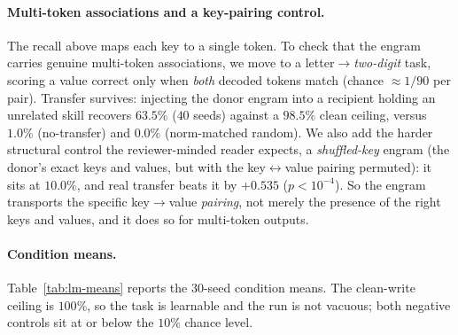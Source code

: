 \documentclass[11pt]{article}
\theoremstyle{definition}
\begin{document}
\paragraph{Multi-token associations and a key-pairing control.}
The recall above maps each key to a single token. To check that the engram carries genuine multi-token associations, we move to a letter$\to$\emph{two-digit} task, scoring a value correct only when \emph{both} decoded tokens match (chance $\approx 1/90$ per pair). Transfer survives: injecting the donor engram into a recipient holding an unrelated skill recovers $63.5\%$ ($40$ seeds) against a $98.5\%$ clean ceiling, versus $1.0\%$ (no-transfer) and $0.0\%$ (norm-matched random). We also add the harder structural control the reviewer-minded reader expects, a \emph{shuffled-key} engram (the donor's exact keys and values, but with the key$\leftrightarrow$value pairing permuted): it sits at $10.0\%$, and real transfer beats it by $+0.535$ ($p<10^{-4}$). So the engram transports the specific key$\to$value \emph{pairing}, not merely the presence of the right keys and values, and it does so for multi-token outputs.

\paragraph{Condition means.}
Table~\ref{tab:lm-means} reports the $30$-seed condition means. The clean-write ceiling is $100\%$, so the task is learnable and the run is not vacuous; both negative controls sit at or below the $10\%$ chance level.
\end{document}
